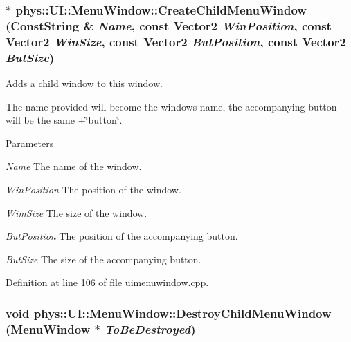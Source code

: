 \hypertarget{classphys_1_1UI_1_1MenuWindow_a5da3c65def5ce495685c086750e55132}{
\subsubsection[{CreateChildMenuWindow}]{ $\ast$ phys::UI::MenuWindow::CreateChildMenuWindow ({\bf ConstString} \& {\em Name}, \/  const {\bf Vector2} {\em WinPosition}, \/  const {\bf Vector2} {\em WinSize}, \/  const {\bf Vector2} {\em ButPosition}, \/  const {\bf Vector2} {\em ButSize})}}
\label{d4/d07/classphys_1_1UI_1_1MenuWindow_a5da3c65def5ce495685c086750e55132}


Adds a child window to this window. 

The name provided will become the windows name, the accompanying button will be the same +\char`\"{}button\char`\"{}. 
\begin{DoxyParams}{Parameters}
\item[{\em Name}]The name of the window. \item[{\em WinPosition}]The position of the window. \item[{\em WimSize}]The size of the window. \item[{\em ButPosition}]The position of the accompanying button. \item[{\em ButSize}]The size of the accompanying button. \end{DoxyParams}


Definition at line 106 of file uimenuwindow.cpp.

\hypertarget{classphys_1_1UI_1_1MenuWindow_ace2796c2d250fe1582f7c43333a7295e}{
\subsubsection[{DestroyChildMenuWindow}]{\setlength{\rightskip}{0pt plus 5cm}void phys::UI::MenuWindow::DestroyChildMenuWindow ({\bf MenuWindow} $\ast$ {\em ToBeDestroyed})}}
\label{d4/d07/classphys_1_1UI_1_1MenuWindow_ace2796c2d250fe1582f7c43333a7295e}


